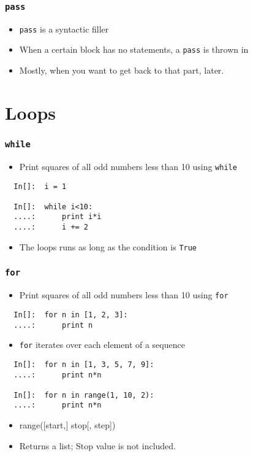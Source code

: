\begin{frame}[fragile]
  \frametitle{\texttt{pass}}
  \begin{itemize}
  \item \texttt{pass} is a syntactic filler
  \item When a certain block has no statements, a \texttt{pass} is
    thrown in
  \item Mostly, when you want to get back to that part, later.
  \end{itemize}
\end{frame}

\section{Loops}

\begin{frame}[fragile]
  \frametitle{\texttt{while}}
  \begin{itemize}
  \item Print squares of all odd numbers less than 10 using
    \texttt{while} 
  \end{itemize}
  \begin{lstlisting}
  In[]:  i = 1

  In[]:  while i<10:
  ....:      print i*i
  ....:      i += 2
  \end{lstlisting}
  \begin{itemize}
  \item The loops runs as long as the condition is \texttt{True}
  \end{itemize}
\end{frame}

\begin{frame}[fragile]
  \frametitle{\texttt{for}}
  \begin{itemize}
  \item Print squares of all odd numbers less than 10 using
    \texttt{for}
  \end{itemize}
  \begin{lstlisting}
  In[]:  for n in [1, 2, 3]:
  ....:      print n
  \end{lstlisting}
  \begin{itemize}
  \item \texttt{for} iterates over each element of a sequence
  \end{itemize}
  \begin{lstlisting}
  In[]:  for n in [1, 3, 5, 7, 9]: 
  ....:      print n*n

  In[]:  for n in range(1, 10, 2):
  ....:      print n*n
  \end{lstlisting}
  \begin{itemize}
  \item \alert{range([start,] stop[, step])}
  \item Returns a list; Stop value is not included. 
  \end{itemize}
\end{frame}


